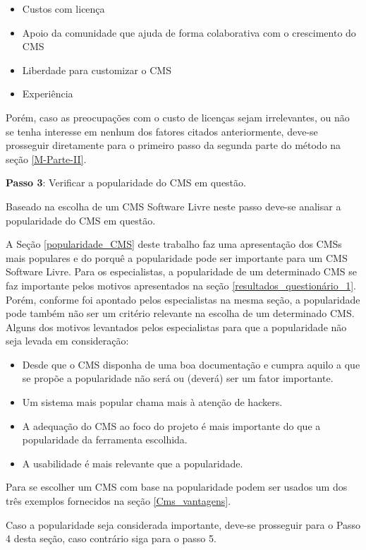 \begin{itemize}
\item Custos com licença
\item Apoio da comunidade que ajuda de forma colaborativa com o crescimento do CMS
\item Liberdade para customizar o CMS
\item Experiência
\end{itemize}

Porém, caso as preocupações com o custo de licenças sejam irrelevantes, ou não se tenha interesse em nenhum dos fatores citados anteriormente, deve-se prosseguir diretamente para o primeiro passo da segunda parte do método na seção \ref{M-Parte-II}.   

\textbf{Passo 3}: Verificar a popularidade do CMS em questão.

Baseado na escolha de um CMS Software Livre neste passo deve-se analisar a popularidade do CMS em questão.

A Seção \ref{popularidade_CMS} deste trabalho faz uma apresentação dos CMSs mais populares e do porquê a popularidade pode ser importante para um CMS Software Livre. Para os especialistas, a popularidade de um determinado CMS se faz importante pelos motivos apresentados na seção \ref{resultados_questionário_1}. Porém, conforme foi  apontado pelos especialistas na mesma seção, a popularidade pode também não ser um critério relevante na escolha de um determinado CMS. Alguns dos motivos levantados pelos especialistas para que a popularidade não seja levada em consideração:   

\begin{itemize}
\item Desde que o CMS disponha de uma boa documentação e cumpra aquilo a que se propõe a popularidade não será ou (deverá) ser um fator importante.
\item Um sistema mais popular chama mais à atenção de hackers.
\item A adequação do CMS ao foco do projeto é mais importante do que a popularidade da ferramenta escolhida. 
\item A usabilidade é mais relevante que a popularidade.
\end{itemize}

Para se escolher um CMS com base na popularidade podem ser usados um dos três exemplos fornecidos na seção \ref{Cms_vantagens}. 

Caso a popularidade seja considerada importante, deve-se prosseguir para o Passo 4 desta seção, caso contrário siga para o passo 5.

